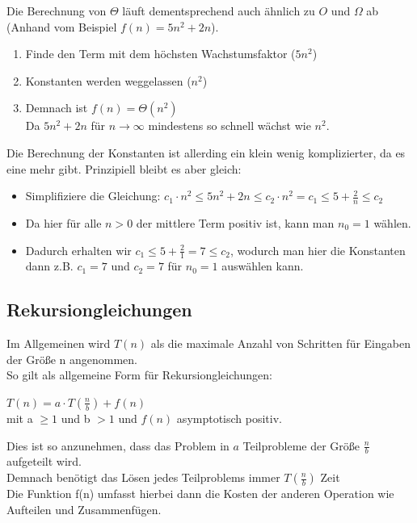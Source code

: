 \documentclass[
../../AuD-Zusammenfassung.tex,
]
{subfiles}
\begin{document}
Die Berechnung von $\Theta$ läuft dementsprechend auch ähnlich zu $O$ und $\Omega$ ab (Anhand vom Beispiel $f(n) = 5n^2 + 2n$). 
\begin{enumerate}
    \item Finde den Term mit dem höchsten Wachstumsfaktor ($5n^2$)
    \item Konstanten werden weggelassen ($n^2$)
    \item Demnach ist $f(n) = \Theta(n^2)$\\
    Da $5n^2 + 2n$ für $n \to \infty$ mindestens so schnell wächst wie $n^2$.
\end{enumerate}
Die Berechnung der Konstanten ist allerding ein klein wenig komplizierter, da es eine mehr gibt. Prinzipiell bleibt es aber gleich:
\begin{itemize}
    \item Simplifiziere die Gleichung: $c_1 \cdot n^2 \leq 5n^2 + 2n \leq c_2 \cdot n^2 = c_1 \leq 5 + \frac{2}{n} \leq c_2$
    \item Da hier für alle $n > 0$ der mittlere Term positiv ist, kann man $n_0 = 1$ wählen. 
    \item Dadurch erhalten wir $c_1 \leq 5 + \frac{2}{1} = 7 \leq c_2$, wodurch man hier die Konstanten dann z.B. $c_1 = 7$ und $c_2 = 7$ für $n_0 = 1$ auswählen kann.
\end{itemize}

\newpage
\subsection{Rekursiongleichungen}
Im Allgemeinen wird $T(n)$ als die maximale Anzahl von Schritten für Eingaben der Größe n angenommen. \\
So gilt als allgemeine Form für Rekursiongleichungen: 
\begin{center}
    $T(n) = a\cdot T(\frac{n}{b}) + f(n)$\\
    mit a $\geq 1$ und b $> 1$ und $f(n)$ asymptotisch positiv.
\end{center}
Dies ist so anzunehmen, dass das Problem in $a$ Teilprobleme der Größe $\frac{n}{b}$ aufgeteilt wird.\\
Demnach benötigt das Lösen jedes Teilproblems immer $T(\frac{n}{b})$ Zeit\\
Die Funktion f(n) umfasst hierbei dann die Kosten der anderen Operation wie Aufteilen und Zusammenfügen.
\end{document}
